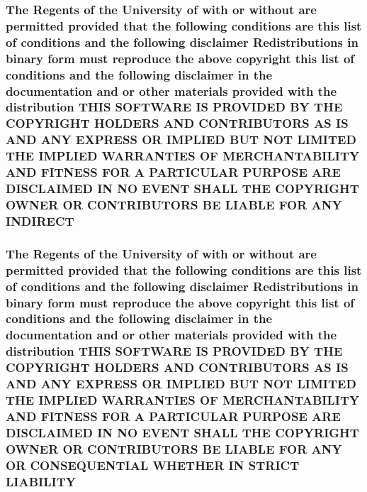 \hypertarget{_l_i_c_e_n_s_e_a2d3578b70dc432980cb5a8bf3002a207}{
\subsubsection[{I\+N\+D\+I\+R\+E\+C\+T}]{\setlength{\rightskip}{0pt plus 5cm}The Regents of the University of with or without are permitted provided that the following conditions are this list of conditions and the following disclaimer Redistributions in binary form must reproduce the above copyright this list of conditions and the following disclaimer in the documentation and or other materials provided with the distribution T\+H\+I\+S S\+O\+F\+T\+W\+A\+R\+E I\+S P\+R\+O\+V\+I\+D\+E\+D B\+Y T\+H\+E C\+O\+P\+Y\+R\+I\+G\+H\+T H\+O\+L\+D\+E\+R\+S A\+N\+D C\+O\+N\+T\+R\+I\+B\+U\+T\+O\+R\+S A\+S I\+S A\+N\+D A\+N\+Y E\+X\+P\+R\+E\+S\+S O\+R I\+M\+P\+L\+I\+E\+D B\+U\+T N\+O\+T L\+I\+M\+I\+T\+E\+D T\+H\+E I\+M\+P\+L\+I\+E\+D {\bf W\+A\+R\+R\+A\+N\+T\+I\+E\+S} O\+F M\+E\+R\+C\+H\+A\+N\+T\+A\+B\+I\+L\+I\+T\+Y A\+N\+D F\+I\+T\+N\+E\+S\+S F\+O\+R A P\+A\+R\+T\+I\+C\+U\+L\+A\+R P\+U\+R\+P\+O\+S\+E A\+R\+E D\+I\+S\+C\+L\+A\+I\+M\+E\+D I\+N N\+O E\+V\+E\+N\+T S\+H\+A\+L\+L T\+H\+E C\+O\+P\+Y\+R\+I\+G\+H\+T O\+W\+N\+E\+R O\+R C\+O\+N\+T\+R\+I\+B\+U\+T\+O\+R\+S B\+E L\+I\+A\+B\+L\+E F\+O\+R A\+N\+Y I\+N\+D\+I\+R\+E\+C\+T}}\label{_l_i_c_e_n_s_e_a2d3578b70dc432980cb5a8bf3002a207}
\hypertarget{_l_i_c_e_n_s_e_a75e09f34e85911710a689d696b2b04ac}{
\subsubsection[{L\+I\+A\+B\+I\+L\+I\+T\+Y}]{\setlength{\rightskip}{0pt plus 5cm}The Regents of the University of with or without are permitted provided that the following conditions are this list of conditions and the following disclaimer Redistributions in binary form must reproduce the above copyright this list of conditions and the following disclaimer in the documentation and or other materials provided with the distribution T\+H\+I\+S S\+O\+F\+T\+W\+A\+R\+E I\+S P\+R\+O\+V\+I\+D\+E\+D B\+Y T\+H\+E C\+O\+P\+Y\+R\+I\+G\+H\+T H\+O\+L\+D\+E\+R\+S A\+N\+D C\+O\+N\+T\+R\+I\+B\+U\+T\+O\+R\+S A\+S I\+S A\+N\+D A\+N\+Y E\+X\+P\+R\+E\+S\+S O\+R I\+M\+P\+L\+I\+E\+D B\+U\+T N\+O\+T L\+I\+M\+I\+T\+E\+D T\+H\+E I\+M\+P\+L\+I\+E\+D {\bf W\+A\+R\+R\+A\+N\+T\+I\+E\+S} O\+F M\+E\+R\+C\+H\+A\+N\+T\+A\+B\+I\+L\+I\+T\+Y A\+N\+D F\+I\+T\+N\+E\+S\+S F\+O\+R A P\+A\+R\+T\+I\+C\+U\+L\+A\+R P\+U\+R\+P\+O\+S\+E A\+R\+E D\+I\+S\+C\+L\+A\+I\+M\+E\+D I\+N N\+O E\+V\+E\+N\+T S\+H\+A\+L\+L T\+H\+E C\+O\+P\+Y\+R\+I\+G\+H\+T O\+W\+N\+E\+R O\+R C\+O\+N\+T\+R\+I\+B\+U\+T\+O\+R\+S B\+E L\+I\+A\+B\+L\+E F\+O\+R A\+N\+Y O\+R C\+O\+N\+S\+E\+Q\+U\+E\+N\+T\+I\+A\+L W\+H\+E\+T\+H\+E\+R I\+N S\+T\+R\+I\+C\+T L\+I\+A\+B\+I\+L\+I\+T\+Y}}\label{_l_i_c_e_n_s_e_a75e09f34e85911710a689d696b2b04ac}
